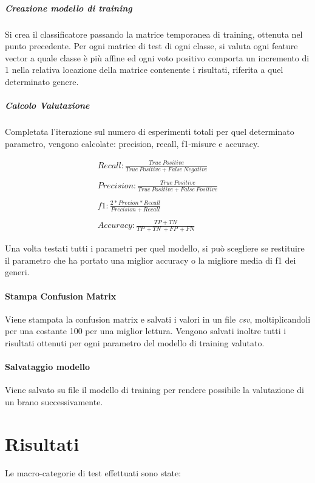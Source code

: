 \documentclass[%
 reprint,
 amsmath,amssymb,
 aps,
 article,
]{revtex4-1}
\begin{document}
\subparagraph{Creazione modello di training}
Si crea il classificatore passando la matrice temporanea di training, ottenuta nel punto precedente. Per ogni matrice di test di ogni classe, si valuta ogni feature vector a quale classe è più affine ed ogni voto positivo comporta un incremento di 1 nella relativa locazione della matrice contenente i risultati, riferita a quel determinato genere.

\subparagraph{Calcolo Valutazione}
Completata l'iterazione sul numero di esperimenti totali per quel determinato parametro, vengono calcolate: precision, recall, f1-misure e accuracy.

\begin{align*}
Recall:
\frac{ True\ Positive } { True\ Positive + False\ Negative }
\\\\
Precision:
\frac{ True\ Positive } { True\ Positive + False\ Positive }
\\\\
f1:
\frac{ 2* Precion * Recall } {Precision + Recall}
\\\\
Accuracy:
\frac{ TP + TN } { TP\ + TN\ + FP\ + FN }
\end{align*}


Una volta testati tutti i parametri per quel modello, si può scegliere se restituire il parametro che ha portato una miglior accuracy o la migliore media di f1 dei generi.
\\
\paragraph{Stampa Confusion Matrix}
Viene stampata la confusion matrix e salvati i valori in un file \textit{csv}, moltiplicandoli per una costante 100 per una miglior lettura. Vengono salvati inoltre tutti i risultati ottenuti per ogni parametro del modello di training valutato.
\\
\paragraph{Salvataggio modello}
Viene salvato su file il modello di training per rendere possibile la valutazione di un brano successivamente.



\section{\label{sec:level1}Risultati}
Le macro-categorie di test effettuati sono state:
\end{document}
